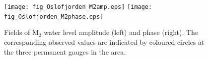 \begin{figure}[!t]
\centering
\texttt{[image: fig\_Oslofjorden\_M2amp.eps]}
\texttt{[image: fig\_Oslofjorden\_M2phase.eps]}
\caption{Fields of M$_2$ water level amplitude (left) and phase (right). The corresponding observed values are indicated by coloured circles at the three permanent gauges in the area.}
\label{fig:Oslofjord_tidal_fields}
\end{figure}





